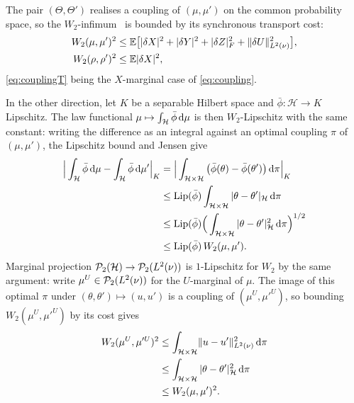 \begin{remark}\label{rem:wasserstein-bounds}
The pair $(\Theta,\Theta')$ realises a coupling of $(\mu,\mu')$ on the common probability
space, so the $W_2$-infimum~\cite[Definition~6.1]{Villani2009} is bounded by its synchronous transport
cost:
\begin{align}
W_2(\mu,\mu')^2&\le\mathbb{E}\big[|\delta X|^2+|\delta Y|^2+|\delta Z|_F^2+\lVert \delta U\rVert_{L^2(\nu)}^2\big],
\label{eq:coupling}\\
W_2(\rho,\rho')^2&\le\mathbb{E}|\delta X|^2 ,\label{eq:couplingT}
\end{align}
\eqref{eq:couplingT} being the $X$-marginal case of \eqref{eq:coupling}.

In the other direction, let $K$ be a separable Hilbert space and $\bar\phi:\mathcal H\to K$
Lipschitz. The law functional $\mu\mapsto\int_{\mathcal H}\bar\phi\,\mathrm{d}\mu$ is then
$W_2$-Lipschitz with the same constant: writing the difference as an integral against an
optimal coupling $\pi$ of $(\mu,\mu')$, the Lipschitz bound and Jensen give
\begin{align}
\Big|\int_{\mathcal H}\bar\phi\,\mathrm{d}\mu-\int_{\mathcal H}\bar\phi\,\mathrm{d}\mu'\Big|_K
&=\Big|\int_{\mathcal H\times\mathcal H}\big(\bar\phi(\theta)-\bar\phi(\theta')\big)\,\mathrm{d}\pi\Big|_K\nonumber\\
&\le\mathrm{Lip}(\bar\phi)\int_{\mathcal H\times\mathcal H}|\theta-\theta'|_{\mathcal H}\,\mathrm{d}\pi\nonumber\\
&\le\mathrm{Lip}(\bar\phi)\Big(\int_{\mathcal H\times\mathcal H}|\theta-\theta'|_{\mathcal H}^2\,\mathrm{d}\pi\Big)^{1/2}\nonumber\\
&\le\mathrm{Lip}(\bar\phi)\,W_2(\mu,\mu') .\label{eq:lipfun}
\end{align}
Marginal projection $\mathcal P_2(\mathcal H)\to\mathcal P_2(L^2(\nu))$ is $1$-Lipschitz for $W_2$
by the same argument: write $\mu^U\in\mathcal P_2(L^2(\nu))$ for the $U$-marginal of $\mu$. The image
of this optimal $\pi$ under $(\theta,\theta')\mapsto(u,u')$ is a coupling of
$(\mu^U,\mu'^U)$, so bounding $W_2(\mu^U,\mu'^U)$ by its cost gives
\begin{align}
W_2(\mu^U,\mu'^U)^2
&\le\int_{\mathcal H\times\mathcal H}\lVert u-u'\rVert_{L^2(\nu)}^2\,\mathrm{d}\pi\nonumber\\
&\le\int_{\mathcal H\times\mathcal H}|\theta-\theta'|_{\mathcal H}^2\,\mathrm{d}\pi\nonumber\\
&\le W_2(\mu,\mu')^2 .\label{eq:margproj}
\end{align}
\end{remark}
